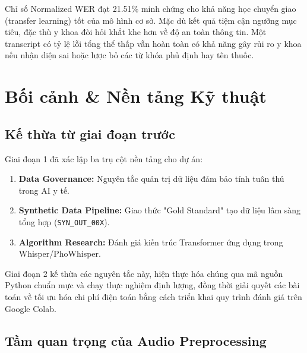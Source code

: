 \documentclass[12pt,a4paper]{article}
\begin{document}
Chỉ số Normalized WER đạt 21.51\% minh chứng cho khả năng học chuyển giao (transfer learning) tốt của mô hình cơ sở. Mặc dù kết quả tiệm cận ngưỡng mục tiêu, đặc thù y khoa đòi hỏi khắt khe hơn về độ an toàn thông tin. Một transcript có tỷ lệ lỗi tổng thể thấp vẫn hoàn toàn có khả năng gây rủi ro y khoa nếu nhận diện sai hoặc lược bỏ các từ khóa phủ định hay tên thuốc.

\section{Bối cảnh \& Nền tảng Kỹ thuật}

\subsection{Kế thừa từ giai đoạn trước}

Giai đoạn 1 đã xác lập ba trụ cột nền tảng cho dự án:
\begin{enumerate}[leftmargin=1.2cm]
    \item \textbf{Data Governance:} Nguyên tắc quản trị dữ liệu đảm bảo tính tuân thủ trong AI y tế.
    \item \textbf{Synthetic Data Pipeline:} Giao thức "Gold Standard" tạo dữ liệu lâm sàng tổng hợp (\texttt{SYN\_OUT\_00X}).
    \item \textbf{Algorithm Research:} Đánh giá kiến trúc Transformer ứng dụng trong Whisper/PhoWhisper.
\end{enumerate}

Giai đoạn 2 kế thừa các nguyên tắc này, hiện thực hóa chúng qua mã nguồn Python chuẩn mực và chạy thực nghiệm định lượng, đồng thời giải quyết các bài toán về tối ưu hóa chi phí điện toán bằng cách triển khai quy trình đánh giá trên Google Colab.

\subsection{Tầm quan trọng của Audio Preprocessing}
\end{document}
